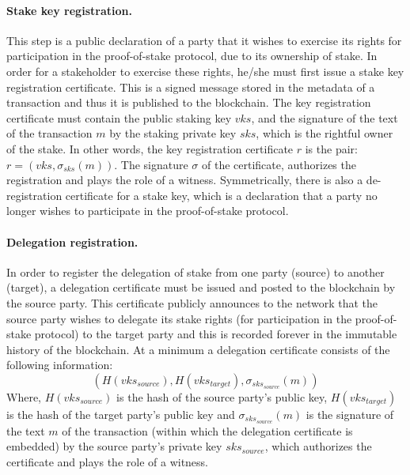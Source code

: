 \paragraph{Stake key registration.}
This step is a public declaration of a party that it wishes to exercise its rights for participation in the proof-of-stake protocol, due to its ownership of stake. In order for a stakeholder to exercise these rights, he/she must first issue a stake key registration certificate. This is a signed message stored in the metadata of a transaction and thus it is published to the blockchain. The key registration certificate must contain the public staking key $vks$, and the signature of the text of the transaction $m$ by the staking private key $sks$, which is the rightful owner of the stake. In other words, the key registration certificate $r$ is the pair: $r = (vks, \sigma_{sks}(m))$. The signature $\sigma$ of the certificate, authorizes the registration and  plays the role of a witness. 
Symmetrically, there is also a de-registration certificate for a stake key, which is a declaration that a party no longer wishes to participate in the proof-of-stake protocol.

\paragraph{Delegation registration.} 
In order to register the delegation of stake from one party (source) to another (target), a delegation certificate must be issued and posted to the blockchain by the source party. This certificate publicly announces to the network that the source party wishes to delegate its stake rights (for participation in the proof-of-stake protocol) to the target party and this is recorded forever in the immutable history of the blockchain. 
At a minimum a delegation certificate consists of the following information:
$$
(H(vks_{source}), H(vks_{target}), \sigma_{sks_{source}}(m))
$$ 
Where, $H(vks_{source})$ is the hash of the source party's public key, $H(vks_{target})$ is the hash of the target party's public key and $\sigma_{sks_{source}}(m)$ is the signature of the text $m$ of the transaction (within which the delegation certificate is embedded) by the source party's private key $sks_{source}$, which authorizes the certificate and plays the role of a witness.

